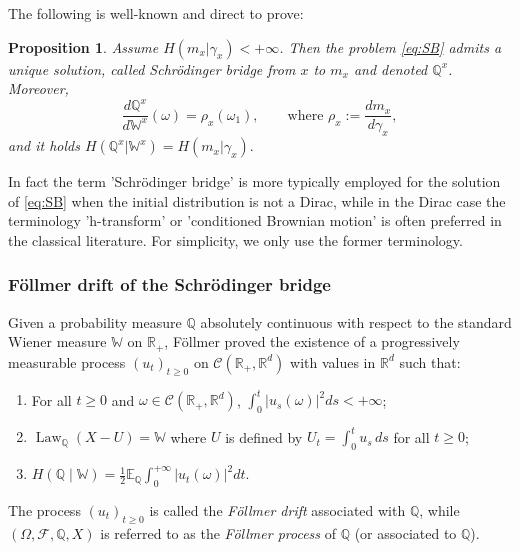 \documentclass[reqno, a4paper]{amsart}
\theoremstyle{plain}
\newtheorem{proposition}[theorem]{Proposition}
\theoremstyle{definition}
\theoremstyle{remark}
\numberwithin{equation}{section}
\numberwithin{theorem}{section}
\newcommand{\R}{\mathbb{R}}
\newcommand{\Law}{\operatorname{Law}}
\begin{document}
	The following is well-known and direct to prove:
	
	
	\begin{proposition}
		Assume $H(m_x|\gamma_x)<+ \infty$. Then the problem \eqref{eq:SB} admits a unique solution, called Schrödinger bridge from $x$ to $m_x$ and denoted $\mathbb{Q}^x$. Moreover,  \begin{equation*}
			\label{eq:rho_x}\frac{d\mathbb{Q}^x}{d \mathbb{W}^x}(\omega) = \rho_x(\omega_1), \qquad \text{where } \rho_x := \frac{d m_x}{d \gamma_x}, 
		\end{equation*}
		and it holds $H(\mathbb{Q}^x|\mathbb{W}^x) = H(m_x|\gamma_x).$
	\end{proposition}
	
	In fact the term 'Schrödinger bridge' is more typically employed for the solution of \eqref{eq:SB} when the initial distribution is not a Dirac, while in the Dirac case the terminology 'h-transform' or 'conditioned Brownian motion' is often preferred in the classical literature. For simplicity, we only use the former terminology.
	
	
	\subsubsection{Föllmer drift of the Schrödinger bridge}
	Given a probability measure $\mathbb{Q}$ absolutely continuous with respect to the standard Wiener measure $\mathbb{W}$ on $\R_+$, Föllmer proved the existence of a progressively measurable process $(u_t)_{t \geq 0}$ on $\mathcal C(\R_+,\R^d)$ with values in $\R^d$ such that:
	\begin{enumerate}
		\item For all $t \geq 0$ and $\omega \in \mathcal C(\R_+,\R^d)$, $\int_0^t |u_s(\omega)|^2 ds < +\infty$;
		\item $\Law_{\mathbb{Q}}(X - U) = \mathbb{W}$ where $U$ is defined by $U_t = \int_0^t u_s\,ds$ for all $t \geq 0$;
		\item $H(\mathbb{Q}\mid\mathbb{W}) = \frac{1}{2} \mathbb E_{\mathbb{Q}}\int_0^{+\infty} |u_t(\omega)|^2dt $.
	\end{enumerate}
	The process $(u_t)_{t \geq 0}$ is called the \emph{Föllmer drift} associated with $\mathbb{Q}$, while $(\Omega,\mathcal{F},\mathbb{Q},X)$ is referred to as the \emph{Föllmer process} of $\mathbb{Q}$ (or associated to $\mathbb{Q}$).
	
\end{document}
